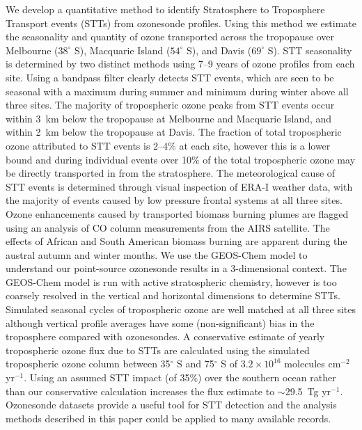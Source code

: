   We develop a quantitative method to identify Stratosphere to Troposphere Transport events (STTs) from ozonesonde profiles. 
  Using this method we estimate the seasonality and quantity of ozone transported across the tropopause over Melbourne ($38^\circ$ S), Macquarie Island ($54^\circ$ S), and Davis ($69^\circ$ S).
  STT seasonality is determined by two distinct methods using 7--9 years of ozone profiles from each site.
  Using a bandpass filter clearly detects STT events, which are seen to be seasonal with a maximum during summer and minimum during winter above all three sites.
  The majority of tropospheric ozone peaks from STT events occur within 3~km below the tropopause at Melbourne and Macquarie Island, and within 2~km below the tropopause at Davis.
  The fraction of total tropospheric ozone attributed to STT events is 2–4\% at each site, however this is a lower bound and during individual events over 10\% of the total tropospheric ozone may be directly transported in from the stratosphere.
  The meteorological cause of STT events is determined through visual inspection of ERA-I weather data, with the majority of events caused by low pressure frontal systems at all three sites.
  Ozone enhancements caused by transported biomass burning plumes are flagged using an analysis of CO column measurements from the AIRS satellite.
  The effects of African and South American biomass burning are apparent during the austral autumn and winter months.
  We use the GEOS-Chem model to understand our point-source ozonesonde results in a 3-dimensional context.
  The GEOS-Chem model is run with active stratospheric chemistry, however is too coarsely resolved in the vertical and horizontal dimensions to determine STTs.
  Simulated seasonal cycles of tropospheric ozone are well matched at all three sites although vertical profile averages have some (non-significant) bias in the troposphere compared with ozonesondes.
  A conservative estimate of yearly tropospheric ozone flux due to STTs are calculated using the simulated tropospheric ozone column between 35$^\circ$ S and 75$^\circ$ S of $3.2\times10^{16}$ molecules cm$^{-2}$ yr$^{-1}$.
  Using an assumed STT impact (of 35\%) over the southern ocean rather than our conservative calculation increases the flux estimate to $\sim$29.5~Tg yr$^{-1}$.
  Ozonesonde datasets provide a useful tool for STT detection and the analysis methods described in this paper could be applied to many available records.
  